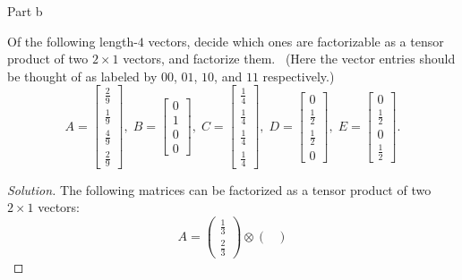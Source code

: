 \begin{solution}{Part b}\label{ques:2b}
  \begin{question}
    Of the following length-$4$ vectors, decide which ones are factorizable as a tensor product of two $2 \times 1$ vectors, and factorize them. \ (Here the vector entries
    should be thought of as labeled by $00$, $01$, $10$, and $11$ respectively.)%
    \[
    A=
    \begin{bmatrix}
      \frac{2}{9}\\[0.1em]
      \frac{1}{9}\\[0.1em]
      \frac{4}{9}\\[0.1em]
      \frac{2}{9}
    \end{bmatrix}\!,\;
    B=
    \begin{bmatrix}
      0\\
      1\\
      0\\
      0
    \end{bmatrix}\!,\;
    C=
    \begin{bmatrix}
      \frac{1}{4}\\[0.1em]
      \frac{1}{4}\\[0.1em]
      \frac{1}{4}\\[0.1em]
      \frac{1}{4}
    \end{bmatrix}\!,\;
    D=
    \begin{bmatrix}
      0\\
      \frac{1}{2}\\[0.1em]
      \frac{1}{2}\\
      0
    \end{bmatrix}\!,\;
    E=
    \begin{bmatrix}
      0\\
      \frac{1}{2}\\
      0\\
      \frac{1}{2}
    \end{bmatrix}.
    \]
  \end{question}
  \tcblower{}
  \begin{proof}[Solution]
    The following matrices can be factorized as a tensor product of two $2 \times 1$ vectors:
    \begin{equation}
      A = \begin{pmatrix}
            \frac{1}{3}\\[0.1em]
            \frac{2}{3}
          \end{pmatrix}
          \otimes
          \begin{pmatrix}

\end{pmatrix}
\end{equation}
\end{proof}
\end{solution}
